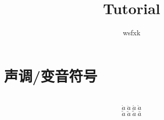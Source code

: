 \documentclass{article}
\author{wsfxk}
\title{Tutorial}
\begin{document}
	\maketitle
	\section{声调/变音符号}\\
	$$ \dot{a}\ \ddot{a}\ \acute{a}\ \grave{a} $$
	$$ \check{a}\ \breve{a}\ \tilde{a}\ \bar{a} $$
\end{document}
